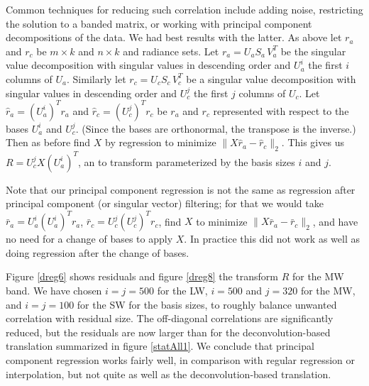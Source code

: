 \documentclass[journal]{IEEEtran}
\begin{document}


Common techniques for reducing such correlation include adding
noise, restricting the solution to a banded matrix, or working with
principal component decompositions of the data.  We had best results
with the latter.  As above let $r_a$ and $r_c$ be $m \times k$ and
$n \times k$ {\airs} and {\cris} radiance sets.  Let $r_a = U_a
S_a\,V_a^T$ be the singular value decomposition with singular values
in descending order and $U_a^i$ the first $i$ columns of $U_a$.
Similarly let $r_c = U_c S_c\,V_c^T$ be a singular value
decomposition with singular values in descending order and $U_c^j$
the first $j$ columns of $U_c$.  Let $\hat r_a = (U_a^i)^T r_a$ and
$\hat r_c = (U_c^j)^T r_c$ be $r_a$ and $r_c$ represented with
respect to the bases $U_a^i$ and $U_c^j$.  (Since the bases are
orthonormal, the transpose is the inverse.)  Then as before find $X$
by regression to minimize $\|X \hat r_a - \hat r_c\|_2$.  This gives
us $R = U_c^j X (U_a^i)^T$, an {\airs} to {\cris} transform
parameterized by the basis sizes $i$ and $j$.


Note that our principal component regression is not the same as
regression after principal component (or singular vector) filtering;
for that we would take $\bar r_a = U_a^i (U_a^i)^T r_a$, $\bar r_c =
U_c^j (U_c^j)^T r_c$, find $X$ to minimize $\|X \bar r_a - \bar
r_c\|_2$, and have no need for a change of bases to apply $X$.  In
practice this did not work as well as doing regression after the
change of bases.


Figure \ref{dreg6} shows residuals and figure \ref{dreg8} the
transform $R$ for the {\cris} MW band.  We have chosen $i = j = 500$
for the LW, $i = 500$ and $j = 320$ for the MW, and $i = j = 100$
for the SW for the basis sizes, to roughly balance unwanted
correlation with residual size.  The off-diagonal correlations are
significantly reduced, but the residuals are now larger than for the
deconvolution-based translation summarized in figure \ref{statAll1}.
We conclude that principal component regression works fairly well,
in comparison with regular regression or interpolation, but not
quite as well as the deconvolution-based translation.
\end{document}

